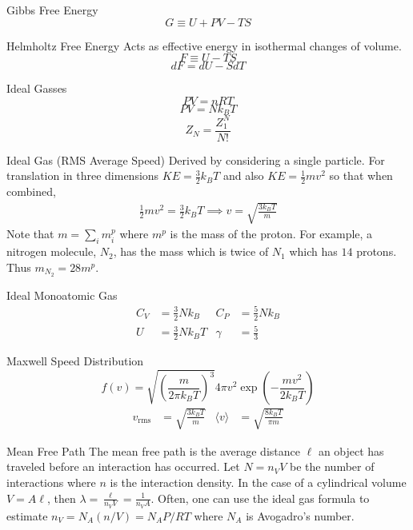 \documentclass[avery5371,grid]{flashcards}
\begin{document}
\begin{flashcard}[Theory]{Gibbs Free Energy}
	\[ G \equiv U + PV - TS \]
\end{flashcard}

\begin{flashcard}[Theory]{Helmholtz Free Energy}
	Acts as effective energy in isothermal changes of volume.
	\[ F \equiv U - TS \]
	\[ dF = dU - S dT \]
\end{flashcard}

\begin{flashcard}[Theory]{Ideal Gasses}
	\[ PV = nRT \]
	\[ PV = N k_B T \]
	\[ Z_N = \frac{Z_1^N}{N!} \]	
\end{flashcard}

\begin{flashcard}[Theory]{Ideal Gas (RMS Average Speed)}
	Derived by considering a single particle. For translation in three
	dimensions $KE = \frac 32 k_B T$  and also $KE = \frac 12 mv^2$ so that
	when combined,
	\begin{align*}
		\frac 12 mv^2 = \frac 32 k_B T \implies \boxed{v = \sqrt{\frac{3 k_B T}{m}}}
	\end{align*}
	Note that $m=\sum_{i}m^p_{i}$ where $m^p$ is the mass of the proton. For example, a nitrogen molecule, $N_2$, has the mass which is twice of $N_1$ which has $14$ protons. Thus $m_{N_2} = 28m^p$.
\end{flashcard}

\begin{flashcard}[Theory]{Ideal Monoatomic Gas}
	\begin{align*}
		C_V &= \frac{3}{2} Nk_B
			& C_P &= \frac{5}{2} Nk_B \\
		U &= \frac{3}{2} Nk_B T
			& {\gamma} &= \frac{5}{3}
	\end{align*}
\end{flashcard}

\begin{flashcard}[Definition]{Maxwell Speed Distribution}
	\[ f(v) = \sqrt{ (\frac{m}{2{\pi} k_B T})^3 } 4{\pi}v^2 \exp(-\frac{mv^2}{2k_B T}) \]
	\begin{align*}
		v_\mathrm{rms} &= \sqrt{\frac{3k_B T}{m}}
			& \langle v\rangle  &= \sqrt{\frac{8k_B T}{{\pi}m}}
	\end{align*}
\end{flashcard}

\begin{flashcard}[Definition]{Mean Free Path}
	The mean free path is the average distance $\ell$ an object has traveled before an interaction has occurred. Let $N=n_V V$ be the number of interactions where $n$ is the interaction density. In the case of a cylindrical volume $V = A\ell$, then $\lambda = \frac{\ell}{n_VV} = \frac{1}{n_V A}.$ Often, one can use the ideal gas formula to estimate $n_V = N_A(n/V) = N_AP/RT$ where $N_A$ is Avogadro's number.
\end{flashcard}
\end{document}
